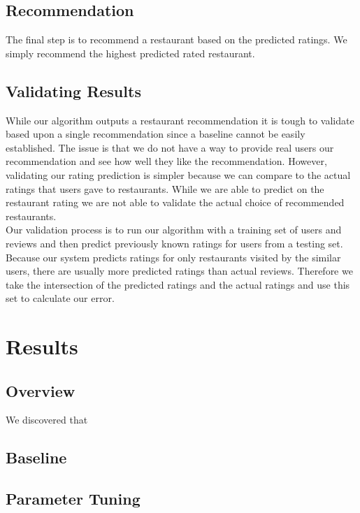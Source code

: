 \documentclass[10pt,twocolumn,letterpaper]{article}
\begin{document}
\subsection{Recommendation}
The final step is to recommend a restaurant based on the predicted ratings. We simply recommend the highest predicted rated restaurant.

\subsection{Validating Results}
While our algorithm outputs a restaurant recommendation it is tough to validate based upon a single recommendation since a baseline cannot be easily established. The issue is that we do not have a way to provide real users our recommendation and see how well they like the recommendation. However, validating our rating prediction is simpler because we can compare to the actual ratings that users gave to restaurants. While we are able to predict on the restaurant rating we are not able to validate the actual choice of recommended restaurants.
\\[0.5em]
\indent Our validation process is to run our algorithm with a training set of users and reviews and then predict previously known ratings for users from a testing set. Because our system predicts ratings for only restaurants visited by the similar users, there are usually more predicted ratings than actual reviews. Therefore we take the intersection of the predicted ratings and the actual ratings and use this set to calculate our error.


\section{Results}

\subsection{Overview}
We discovered that 

\subsection{Baseline}

\subsection{Parameter Tuning}
\end{document}
